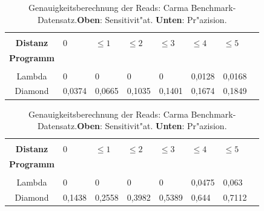 \documentclass[10pt, a4paper]{report}[08.12.2015]
\begin{document}
     \begin{table}[H]
        \begin{tabular}{clllllll}
        &&&&&&\\
          \textbf{Distanz}&0&$\leq1$&$\leq2$&$\leq3$&$\leq4$&$\leq5$\\
          \textbf{Programm}&&&&&\\ \hline  
          &&&&&&\\
          Lambda&0&0&0&0&0,0128&0,0168\\
          Diamond&0,0374&0,0665&0,1035&0,1401&0,1674&0,1849\\
        \end{tabular}

        \begin{tabular}{clllllll}
          &&&&&&\\
          \textbf{Distanz}&0&$\leq1$&$\leq2$&$\leq3$&$\leq4$&$\leq5$\\
          \textbf{Programm}&&&&&\\ \hline  
          &&&&&&\\
          Lambda&0&0&0&0&0,0475&0,063\\
          Diamond&0,1438&0,2558&0,3982&0,5389&0,644&0,7112\\
        \end{tabular}
        \newline
        \caption[Genauigkeitsberechnung der Reads: Carma Benchmark-Datensatz.] {\small{Genauigkeitsberechnung der Reads: Carma Benchmark-Datensatz.\newline \textbf{Oben}: Sensitivit"at. \textbf{Unten}: Pr"azision.}} 
        \label{tab:Carma}
        
      \end{table}
\end{document}
